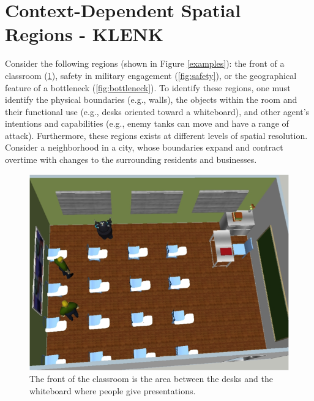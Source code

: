 \documentclass[11pt,letterpaper]{article}
\begin{document}
\section{Context-Dependent Spatial Regions - KLENK}
Consider the following regions (shown in Figure \ref{examples}): the front of a classroom (\ref{fig:classroom}), safety in military engagement (\ref{fig:safety}), or the geographical feature of a bottleneck (\ref{fig:bottleneck}).  To identify these regions, one must identify the physical boundaries (e.g., walls), the objects within the room and their functional use (e.g., desks oriented toward a whiteboard), and other agent's intentions and capabilities (e.g., enemy tanks can move and have a range of attack).  Furthermore, these regions exists at different levels of spatial resolution.  Consider a neighborhood in a city, whose boundaries expand and contract overtime with changes to the surrounding residents and businesses.

\begin{figure}
  \includegraphics[width=\columnwidth*.3]{figures/classroom.png}
  \caption{The front of the classroom is the area between the desks and the whiteboard where people give presentations.}
  \label{fig:classroom}
\end{figure}
\end{document}
